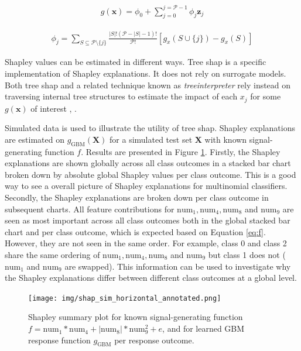 \documentclass{article}
\begin{document}
\begin{equation}
\label{eq:shap_additive}
\begin{aligned}
g(\mathbf{x}) = \phi_0 + \sum_{j=0}^{j=\mathcal{P} - 1} \phi_j \mathbf{z}_j
\end{aligned}
\end{equation}

\begin{equation}
\label{eq:shap_contrib}
\begin{aligned}
\phi_{j} = \sum_{S \subseteq \mathcal{P} \setminus \{j\}}\frac{|S|!(\mathcal{P} -|S| -1)!}{\mathcal{P}!}[g_x(S \cup \{j\}) - g_x(S)]
\end{aligned}
\end{equation}

Shapley values can be estimated in different ways. Tree shap is a specific implementation of Shapley explanations. It does not rely on surrogate models. Both tree shap and a related technique known as \textit{treeinterpreter} rely instead on traversing internal tree structures to estimate the impact of each $x_j$ for some $g(\mathbf{x})$ of interest \cite{tree_shap}, \cite{treeinterpreter}.

Simulated data is used to illustrate the utility of tree shap. Shapley explanations are estimated on $g_{\text{GBM}}(\mathbf{X})$ for a simulated test set $\mathbf{X}$ with known signal-generating function $f$. Results are presented in Figure \ref{fig:global_feature_imp}. Firstly, the Shapley explanations are shown globally across all class outcomes in a stacked bar chart broken down by absolute global Shapley values per class outcome. This is a good way to see a overall picture of Shapley explanations for multinomial classifiers. Secondly, the Shapley explanations are broken down per class outcome in subsequent charts. All feature contributions for $\text{num}_1, \text{num}_4, \text{num}_8$ and $\text{num}_9$ are seen as most important across all class outcomes both in the global stacked bar chart and per class outcome, which is expected based on Equation \ref{eq:f}. However, they are not seen in the same order. For example, class 0 and class 2 share the same ordering of $\text{num}_1, \text{num}_4, \text{num}_8$ and $\text{num}_9$ but class 1 does not ($\text{num}_1$ and $\text{num}_9$ are swapped). This information can be used to investigate why the Shapley explanations differ between different class outcomes at a global level.

\begin{figure}[!htbp]
	\begin{center}
		\texttt{[image: img/shap\_sim\_horizontal\_annotated.png]}
		\caption{Shapley summary plot for known signal-generating function $f = \text{num} _1 * \text{num}_4 + |\text{num}_8| * \text{num}_9^2 + e$, and for learned GBM response function $g_{\text{GBM}}$ per response outcome.}
		\label{fig:global_feature_imp}
	\end{center}
\end{figure}
\FloatBarrier
\end{document}
